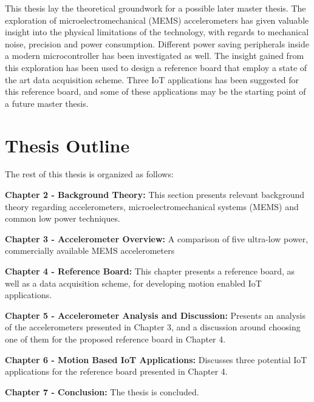 This thesis lay the theoretical groundwork for a possible later master thesis. The exploration of microelectromechanical (MEMS) accelerometers has given valuable insight into the physical limitations of the technology, with regards to mechanical noise, precision and power consumption. Different power saving peripherals inside a modern microcontroller has been investigated as well. The insight gained from this exploration has been used to design a reference board that employ a state of the art data acquisition scheme. Three IoT applications has been suggested for this reference board, and some of these applications may be the starting point of a future master thesis.

\newpage

\section{Thesis Outline}

The rest of this thesis is organized as follows:

\textbf{Chapter 2 - Background Theory:} This section presents relevant background theory regarding accelerometers, microelectromechanical systems (MEMS) and common low power techniques.  

\textbf{Chapter 3 - Accelerometer Overview:} A comparison of five ultra-low power, commercially available MEMS accelerometers

\textbf{Chapter 4 - Reference Board:} This chapter presents a reference board, as well as a data acquisition scheme, for developing motion enabled IoT applications.

\textbf{Chapter 5 - Accelerometer Analysis and Discussion:} Presents an analysis of the accelerometers presented in Chapter 3, and a discussion around choosing one of them for the proposed reference board in Chapter 4.

\textbf{Chapter 6 - Motion Based IoT Applications:} Discusses three potential IoT applications for the reference board presented in Chapter 4.

\textbf{Chapter 7 - Conclusion:} The thesis is concluded.


